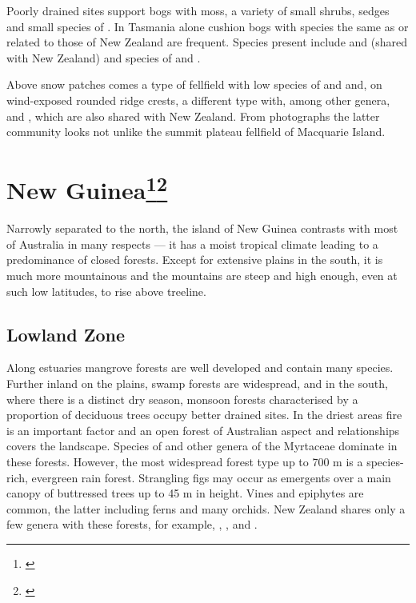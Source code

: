 Poorly drained sites support bogs with  moss, a variety of small shrubs, sedges and small species of .
In Tasmania alone cushion bogs with species the same as or related to those of New Zealand are frequent.
Species present include  and  (shared with New Zealand) and species of  and .

Above snow patches comes a type of fellfield with low species of  and  and, on wind-exposed rounded ridge crests, a different type with, among other genera,  and , which are also shared with New Zealand.
From photographs the latter community looks not unlike the summit plateau fellfield of Macquarie Island.

\section[New Guinea]{New Guinea\footnote{\cite{johns1982plant}}\footnote{\cite{wardle1973newguinea}}}

Narrowly separated to the north, the island of New Guinea contrasts with most of Australia in many respects --- it has a moist tropical climate leading to a predominance of closed forests.
Except for extensive plains in the south, it is much more mountainous and the mountains are steep and high enough, even at such low latitudes, to rise above treeline.

\subsection{Lowland Zone}

Along estuaries mangrove forests are well developed and contain many species.
Further inland on the plains, swamp forests are widespread, and in the south, where there is a distinct dry season, monsoon forests characterised by a proportion of deciduous trees occupy better drained sites.
In the driest areas fire is an important factor and an open forest of Australian aspect and relationships covers the landscape.
Species of  and other genera of the Myrtaceae dominate in these forests.
However, the most widespread forest type up to 700 m is a species-rich, evergreen rain forest.
Strangling figs may occur as emergents over a main canopy of buttressed trees up to 45 m in height.
Vines and epiphytes are common, the latter including ferns and many orchids.
New Zealand shares only a few genera with these forests, for example, , ,  and .

